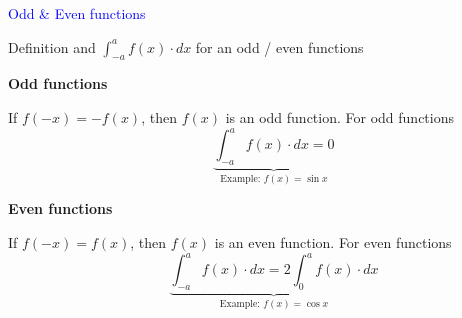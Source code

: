\documentclass[14pt,fleqn]{extarticle}
\begin{document}
\begin{skill}
\begin{narrow}
\textcolor{blue}{Odd \& Even functions} 

Definition and $\int_{-a}^a f(x)\cdot dx$ for an odd / even functions
\end{narrow} 

\reason 

\textbf{Odd functions} 

If $f(-x) = -f(x)$, then $f(x)$ is an odd function.
For odd functions
\[ \qquad \underbrace{\int_{-a}^a f(x)\cdot dx = 0}_{\text{Example: }f(x) = \sin x} \]

\textbf{Even functions} 

If $f(-x) = f(x)$, then $f(x)$ is an even function. For even functions
\[ \qquad \underbrace{\int_{-a}^a f(x)\cdot dx = 2\int_0^a f(x)\cdot dx}_{\text{Example: }f(x) = \cos x}\]


\end{skill}
\end{document}
